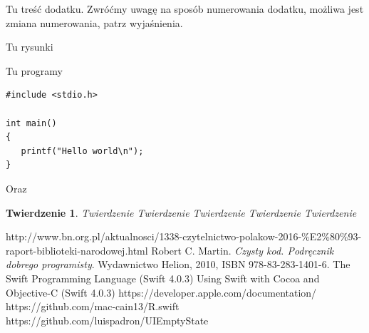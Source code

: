 \documentclass[twoside]{projektInzynierskiMS}
\newtheorem{tw}{Twierdzenie}%
\begin{document}

Tu treść dodatku. Zwróćmy uwagę na sposób numerowania dodatku, 
możliwa jest zmiana numerowania, patrz wyjaśnienia.
          

Tu rysunki


Tu programy

\begin{verbatim}
#include <stdio.h>

int main()
{
   printf("Hello world\n");
}
\end{verbatim}

\noindent
Oraz 

\bigskip

\vrule\hspace{10pt}\begin{minipage}{10cm}
\end{minipage}

\begin{tw}
Twierdzenie Twierdzenie Twierdzenie Twierdzenie Twierdzenie 
\end{tw}
\begin{thebibliography}{12}

 http://www.bn.org.pl/aktualnosci/1338-czytelnictwo-polakow-2016-\%E2\%80\%93-raport-biblioteki-narodowej.html
Robert C. Martin. 
\textit{Czysty kod. Podręcznik dobrego programisty}. 
Wydawnictwo Helion, 2010, ISBN 978-83-283-1401-6.
 The Swift Programming Language (Swift 4.0.3)
 Using Swift with Cocoa and Objective-C (Swift 4.0.3)
 https://developer.apple.com/documentation/
 https://github.com/mac-cain13/R.swift
 https://github.com/luispadron/UIEmptyState

\end{thebibliography}
\end{document}

